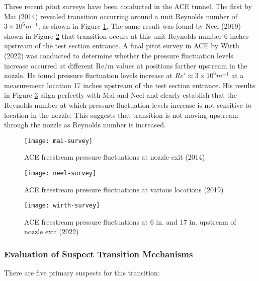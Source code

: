 Three recent pitot surveys have been conducted in the ACE tunnel. The first by Mai (2014) revealed transition occurring around a unit Reynolds number of $3 \times 10^6 m^{-1}$, as shown in Figure \ref{fig:mai-survey}. The same result was found by Neel (2019) shown in Figure \ref{fig:neel-survey} that transition occurs at this unit Reynolds number 6 inches upstream of the test section entrance. A final pitot survey in ACE by Wirth (2022) was conducted to determine whether the pressure fluctuation levels increase occurred at different Re/m values at positions farther upstream in the nozzle. He found pressure fluctuation levels increase at $Re' \approx 3 \times 10^6 m^{-1}$ at a measurement location 17 inches upstream of the test section entrance. His results in Figure \ref{fig:wirth-survey} align perfectly with Mai and Neel and clearly establish that the Reynolds number at which pressure fluctuation levels increase is not sensitive to location in the nozzle. This suggests that transition is not moving upstream through the nozzle as Reynolds number is increased.

\begin{figure}[ht]
    \centering
    \texttt{[image: mai-survey]}
    \caption[ACE freestream pressure fluctuations at nozzle exit (2014)]{ACE freestream pressure fluctuations at nozzle exit (2014) \cite{mai-dis}}
    \label{fig:mai-survey}
\end{figure}

\begin{figure}[ht]
    \centering
    \texttt{[image: neel-survey]}
    \caption[ACE freestream pressure fluctuations at various locations (2019)]{ACE freestream pressure fluctuations at various locations (2019) \cite{neel-dis}}
    \label{fig:neel-survey}
\end{figure}

\begin{figure}[ht]
    \centering
    \texttt{[image: wirth-survey]}
    \caption{ACE freestream pressure fluctuations at 6 in. and 17 in. upstream of nozzle exit (2022)}
    \label{fig:wirth-survey}
\end{figure}

\subsubsection{Evaluation of Suspect Transition Mechanisms}

There are five primary suspects for this transition:


